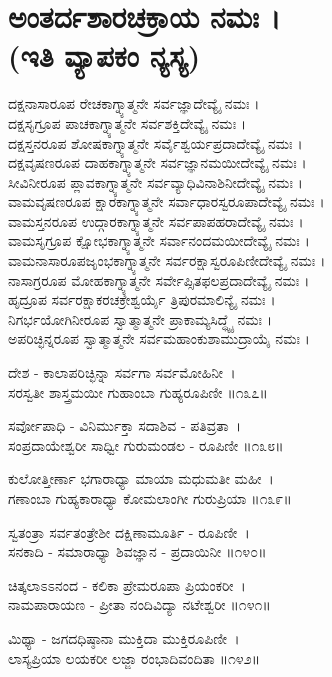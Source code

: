 \section{ಅಂತರ್ದಶಾರಚಕ್ರಾಯ ನಮಃ ।\\ (ಇತಿ ವ್ಯಾಪಕಂ ನ್ಯಸ್ಯ)}
ದಕ್ಷನಾಸಾರೂಪ ರೇಚಕಾಗ್ನ್ಯಾತ್ಮನೇ ಸರ್ವಜ್ಞಾದೇವ್ಯೈ ನಮಃ ।\\
ದಕ್ಷಸೃಗ್ರೂಪ ಪಾಚಕಾಗ್ನ್ಯಾತ್ಮನೇ ಸರ್ವಶಕ್ತಿದೇವ್ಯೈ ನಮಃ ।\\
ದಕ್ಷಸ್ತನರೂಪ ಶೋಷಕಾಗ್ನ್ಯಾತ್ಮನೇ ಸರ್ವೈಶ್ವರ್ಯಪ್ರದಾದೇವ್ಯೈ ನಮಃ ।\\
ದಕ್ಷವೃಷಣರೂಪ ದಾಹಕಾಗ್ನ್ಯಾತ್ಮನೇ ಸರ್ವಜ್ಞಾನಮಯೀದೇವ್ಯೈ ನಮಃ ।\\
ಸೀವಿನೀರೂಪ ಪ್ಲಾವಕಾಗ್ನ್ಯಾತ್ಮನೇ ಸರ್ವವ್ಯಾಧಿವಿನಾಶಿನೀದೇವ್ಯೈ ನಮಃ ।\\
ವಾಮವೃಷಣರೂಪ ಕ್ಷಾರಕಾಗ್ನ್ಯಾತ್ಮನೇ ಸರ್ವಾಧಾರಸ್ವರೂಪಾದೇವ್ಯೈ ನಮಃ ।\\
ವಾಮಸ್ತನರೂಪ ಉದ್ಗಾರಕಾಗ್ನ್ಯಾತ್ಮನೇ ಸರ್ವಪಾಪಹರಾದೇವ್ಯೈ ನಮಃ ।\\
ವಾಮಸೃಗ್ರೂಪ ಕ್ಷೋಭಕಾಗ್ನ್ಯಾತ್ಮನೇ ಸರ್ವಾನಂದಮಯೀದೇವ್ಯೈ ನಮಃ ।\\
ವಾಮನಾಸಾರೂಪಜೃಂಭಕಾಗ್ನ್ಯಾತ್ಮನೇ ಸರ್ವರಕ್ಷಾಸ್ವರೂಪಿಣೀದೇವ್ಯೈ ನಮಃ ।\\
ನಾಸಾಗ್ರರೂಪ ಮೋಹಕಾಗ್ನ್ಯಾತ್ಮನೇ ಸರ್ವೇಪ್ಸಿತಫಲಪ್ರದಾದೇವ್ಯೈ ನಮಃ ।\\
ಹೃದ್ರೂಪ ಸರ್ವರಕ್ಷಾಕರಚಕ್ರೇಶ್ವರ್ಯೈ ತ್ರಿಪುರಮಾಲಿನ್ಯೈ ನಮಃ ।\\
ನಿಗರ್ಭಯೋಗಿನೀರೂಪ ಸ್ವಾತ್ಮಾತ್ಮನೇ ಪ್ರಾಕಾಮ್ಯಸಿದ್ಧ್ಯೈ ನಮಃ ।\\
ಅಪರಿಚ್ಛಿನ್ನರೂಪ ಸ್ವಾತ್ಮಾತ್ಮನೇ ಸರ್ವಮಹಾಂಕುಶಾಮುದ್ರಾಯೈ ನಮಃ ।

ದೇಶ - ಕಾಲಾಪರಿಚ್ಛಿನ್ನಾ ಸರ್ವಗಾ ಸರ್ವಮೋಹಿನೀ~।\\
ಸರಸ್ವತೀ ಶಾಸ್ತ್ರಮಯೀ ಗುಹಾಂಬಾ ಗುಹ್ಯರೂಪಿಣೀ ॥೧೩೭॥

ಸರ್ವೋಪಾಧಿ - ವಿನಿರ್ಮುಕ್ತಾ ಸದಾಶಿವ - ಪತಿವ್ರತಾ~।\\
ಸಂಪ್ರದಾಯೇಶ್ವರೀ ಸಾಧ್ವೀ ಗುರುಮಂಡಲ - ರೂಪಿಣೀ ॥೧೩೮॥

ಕುಲೋತ್ತೀರ್ಣಾ ಭಗಾರಾಧ್ಯಾ ಮಾಯಾ ಮಧುಮತೀ ಮಹೀ~।\\
ಗಣಾಂಬಾ ಗುಹ್ಯಕಾರಾಧ್ಯಾ ಕೋಮಲಾಂಗೀ ಗುರುಪ್ರಿಯಾ ॥೧೩೯॥

ಸ್ವತಂತ್ರಾ ಸರ್ವತಂತ್ರೇಶೀ ದಕ್ಷಿಣಾಮೂರ್ತಿ - ರೂಪಿಣೀ~।\\
ಸನಕಾದಿ - ಸಮಾರಾಧ್ಯಾ ಶಿವಜ್ಞಾನ - ಪ್ರದಾಯಿನೀ ॥೧೪೦॥

ಚಿತ್ಕಲಾಽಽನಂದ - ಕಲಿಕಾ ಪ್ರೇಮರೂಪಾ ಪ್ರಿಯಂಕರೀ~।\\
ನಾಮಪಾರಾಯಣ - ಪ್ರೀತಾ ನಂದಿವಿದ್ಯಾ ನಟೇಶ್ವರೀ ॥೧೪೧॥

ಮಿಥ್ಯಾ - ಜಗದಧಿಷ್ಠಾನಾ ಮುಕ್ತಿದಾ ಮುಕ್ತಿರೂಪಿಣೀ~।\\
ಲಾಸ್ಯಪ್ರಿಯಾ ಲಯಕರೀ ಲಜ್ಜಾ ರಂಭಾದಿವಂದಿತಾ ॥೧೪೨॥

